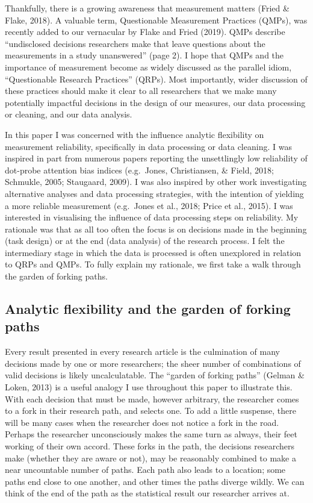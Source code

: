 \documentclass[
  english,
  man,floatsintext]{apa6}
\begin{document}
Thankfully, there is a growing awareness that measurement matters (Fried \& Flake, 2018). A valuable term, Questionable Measurement Practices (QMPs), was recently added to our vernacular by Flake and Fried (2019). QMPs describe \enquote{undisclosed decisions researchers make that leave questions about the measurements in a study unanswered} (page 2). I hope that QMPs and the importance of measurement become as widely discussed as the parallel idiom, \enquote{Questionable Research Practices} (QRPs). Most importantly, wider discussion of these practices should make it clear to all researchers that we make many potentially impactful decisions in the design of our measures, our data processing or cleaning, and our data analysis.

In this paper I was concerned with the influence analytic flexibility on measurement reliability, specifically in data processing or data cleaning. I was inspired in part from numerous papers reporting the unsettlingly low reliability of dot-probe attention bias indices (e.g.~Jones, Christiansen, \& Field, 2018; Schmukle, 2005; Staugaard, 2009). I was also inspired by other work investigating alternative analyses and data processing strategies, with the intention of yielding a more reliable measurement (e.g.~Jones et al., 2018; Price et al., 2015). I was interested in visualising the influence of data processing steps on reliability. My rationale was that as all too often the focus is on decisions made in the beginning (task design) or at the end (data analysis) of the research process. I felt the intermediary stage in which the data is processed is often unexplored in relation to QRPs and QMPs. To fully explain my rationale, we first take a walk through the garden of forking paths.

\hypertarget{analytic-flexibility-and-the-garden-of-forking-paths}{%
\subsection{Analytic flexibility and the garden of forking paths}\label{analytic-flexibility-and-the-garden-of-forking-paths}}

Every result presented in every research article is the culmination of many decisions made by one or more researchers; the sheer number of combinations of valid decisions is likely uncalculatable. The \enquote{garden of forking paths} (Gelman \& Loken, 2013) is a useful analogy I use throughout this paper to illustrate this. With each decision that must be made, however arbitrary, the researcher comes to a fork in their research path, and selects one. To add a little suspense, there will be many cases when the researcher does not notice a fork in the road. Perhaps the researcher unconsciously makes the same turn as always, their feet working of their own accord. These forks in the path, the decisions researchers make (whether they are aware or not), may be reasonably combined to make a near uncountable number of paths. Each path also leads to a location; some paths end close to one another, and other times the paths diverge wildly. We can think of the end of the path as the statistical result our researcher arrives at.
\end{document}
